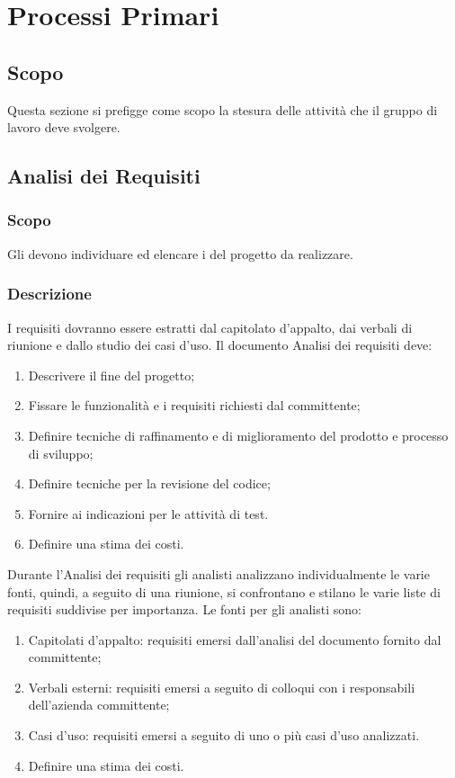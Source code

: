 \documentclass[./../NomeDocumento.tex]{subfiles}
\begin{document}
	
\chapter{Processi Primari}
\section{Scopo}
Questa sezione si prefigge come scopo la stesura delle attività che il gruppo di lavoro deve svolgere.
\section{Analisi dei Requisiti}

	\subsection{Scopo} Gli  devono individuare ed elencare i  del progetto da realizzare.
	\subsection{Descrizione}
	I requisiti dovranno essere estratti dal capitolato d’appalto, dai verbali di riunione e dallo studio dei casi d’uso. 
	Il documento Analisi dei requisiti deve:
	\begin{enumerate}
		\item Descrivere il fine del progetto;
		\item Fissare le funzionalità e i requisiti richiesti dal committente;
		\item Definire tecniche di raffinamento e di miglioramento del prodotto e processo di sviluppo;
		\item Definire tecniche per la revisione del codice;
		\item Fornire ai  indicazioni per le attività di test.
		\item Definire una stima dei costi.
	\end{enumerate}
	 Durante l’Analisi dei requisiti gli analisti analizzano individualmente le varie fonti, quindi, a seguito di una riunione, si confrontano e stilano le varie liste di requisiti suddivise per importanza. Le fonti per gli analisti sono:
	\begin{enumerate}
		\item Capitolati d’appalto: requisiti emersi dall’analisi del documento fornito dal committente;
		\item Verbali esterni: requisiti emersi a seguito di colloqui con i responsabili dell’azienda committente;
		\item Casi d'uso: requisiti emersi a seguito di uno o più casi d’uso analizzati.
		\item Definire una stima dei costi.
	\end{enumerate}
\end{document}
